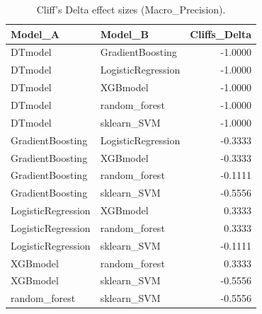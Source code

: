 \begin{table}[t]
\centering
\begin{tabular}{llr}
\toprule
Model_A & Model_B & Cliffs_Delta \\
\midrule
DTmodel & GradientBoosting & -1.0000 \\
DTmodel & LogisticRegression & -1.0000 \\
DTmodel & XGBmodel & -1.0000 \\
DTmodel & random_forest & -1.0000 \\
DTmodel & sklearn_SVM & -1.0000 \\
GradientBoosting & LogisticRegression & -0.3333 \\
GradientBoosting & XGBmodel & -0.3333 \\
GradientBoosting & random_forest & -0.1111 \\
GradientBoosting & sklearn_SVM & -0.5556 \\
LogisticRegression & XGBmodel & 0.3333 \\
LogisticRegression & random_forest & 0.3333 \\
LogisticRegression & sklearn_SVM & -0.1111 \\
XGBmodel & random_forest & 0.3333 \\
XGBmodel & sklearn_SVM & -0.5556 \\
random_forest & sklearn_SVM & -0.5556 \\
\bottomrule
\end{tabular}
\caption{Cliff's Delta effect sizes (Macro_Precision).}
\label{tab:cliffs_Macro_Precision}
\end{table}